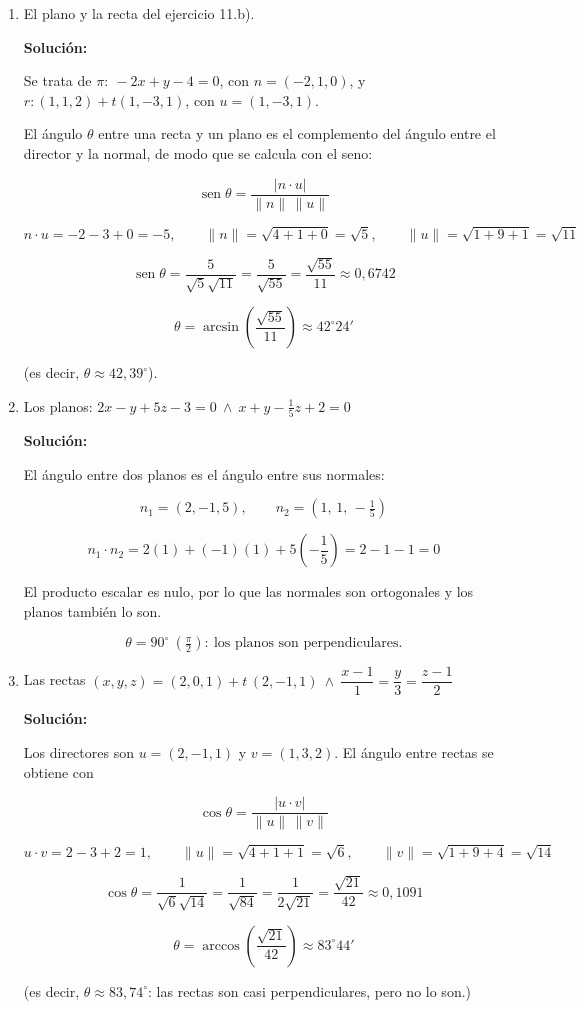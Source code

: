 \documentclass[12pt]{article}
\newcommand{\solucion}{%
    \vspace{0.8em}%
    \textbf{Solución:}%
    \vspace{0.8em}%
}
\begin{document}
\begin{enumerate}[label=\alph*.-]

    \item El plano y la recta del ejercicio 11.b).

    \solucion

    Se trata de $\pi:\ -2x+y-4=0$, con $n=(-2,1,0)$, y
    $r:(1,1,2)+t(1,-3,1)$, con $u=(1,-3,1)$.

    El ángulo $\theta$ entre una recta y un plano es el complemento del
    ángulo entre el director y la normal, de modo que se calcula con el
    seno:

    \[
    \operatorname{sen}\theta=\frac{|n\cdot u|}{\|n\|\,\|u\|}
    \]

    \[
    n\cdot u=-2-3+0=-5,\qquad
    \|n\|=\sqrt{4+1+0}=\sqrt{5},\qquad
    \|u\|=\sqrt{1+9+1}=\sqrt{11}
    \]

    \[
    \operatorname{sen}\theta=\frac{5}{\sqrt{5}\sqrt{11}}=\frac{5}{\sqrt{55}}
    =\frac{\sqrt{55}}{11}\approx0{,}6742
    \]

    \[
    \boxed{\theta=\arcsin\left(\frac{\sqrt{55}}{11}\right)\approx42^{\circ}24'}
    \]

    (es decir, $\theta\approx42{,}39^{\circ}$).

    \item Los planos:
    $2x-y+5z-3=0\ \wedge\ x+y-\tfrac{1}{5}z+2=0$

    \solucion

    El ángulo entre dos planos es el ángulo entre sus normales:

    \[
    n_1=(2,-1,5),\qquad n_2=\left(1,\,1,\,-\tfrac{1}{5}\right)
    \]

    \[
    n_1\cdot n_2=2(1)+(-1)(1)+5\left(-\frac{1}{5}\right)=2-1-1=0
    \]

    El producto escalar es nulo, por lo que las normales son ortogonales y
    los planos también lo son.

    \[
    \boxed{\theta=90^{\circ}\ \left(\tfrac{\pi}{2}\right):\
    \text{los planos son perpendiculares.}}
    \]

    \item Las rectas $(x,y,z)=(2,0,1)+t\,(2,-1,1)\ \wedge\
    \dfrac{x-1}{1}=\dfrac{y}{3}=\dfrac{z-1}{2}$

    \solucion

    Los directores son $u=(2,-1,1)$ y $v=(1,3,2)$. El ángulo entre rectas se
    obtiene con

    \[
    \cos\theta=\frac{|u\cdot v|}{\|u\|\,\|v\|}
    \]

    \[
    u\cdot v=2-3+2=1,\qquad
    \|u\|=\sqrt{4+1+1}=\sqrt{6},\qquad
    \|v\|=\sqrt{1+9+4}=\sqrt{14}
    \]

    \[
    \cos\theta=\frac{1}{\sqrt{6}\sqrt{14}}=\frac{1}{\sqrt{84}}
    =\frac{1}{2\sqrt{21}}=\frac{\sqrt{21}}{42}\approx0{,}1091
    \]

    \[
    \boxed{\theta=\arccos\left(\frac{\sqrt{21}}{42}\right)\approx83^{\circ}44'}
    \]

    (es decir, $\theta\approx83{,}74^{\circ}$: las rectas son casi
    perpendiculares, pero no lo son.)

\end{enumerate}
\end{document}
